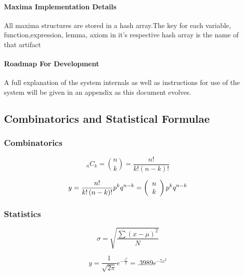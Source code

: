 \documentclass{article}
\begin{document}
\paragraph{Maxima Implementation Details}
All maxima structures are stored in a hash array.The key for each variable, 
function,expression, lemma, axiom in it's respective
hash array is the name of that artifact \newline

\paragraph{Roadmap For Development}
A full explanation of the system internals as well as instructions for use of the system 
will be given in an appendix as this document evolves. \newline

\newpage

\subsection{Combinatorics and Statistical Formulae}

\subsubsection{Combinatorics}
\begin{equation}
_nC_k={n \choose k}=\frac{n!}{k!(n-k)!} 
\end{equation}

\begin{equation}
y = \frac{{n!}}{{k!\left( {n - k} \right)!}}p^k q^{n - k}  = \left( {\begin{array}{*{20}c}n  \\ k  \\ \end{array}} \right)p^k q^{n - k}
\end{equation}


\subsubsection{Statistics}

\begin{equation}
\sigma = \sqrt{\frac{\sum{(x-\mu)^2}}{N}} \nonumber
\end{equation}

\begin{equation}
y = \frac{1}{{\sqrt {2\pi } }}e^{ - \frac{{z^2 }}{2}}  = .3989e^{ - 5z^2 }
\end{equation}
\end{document}
